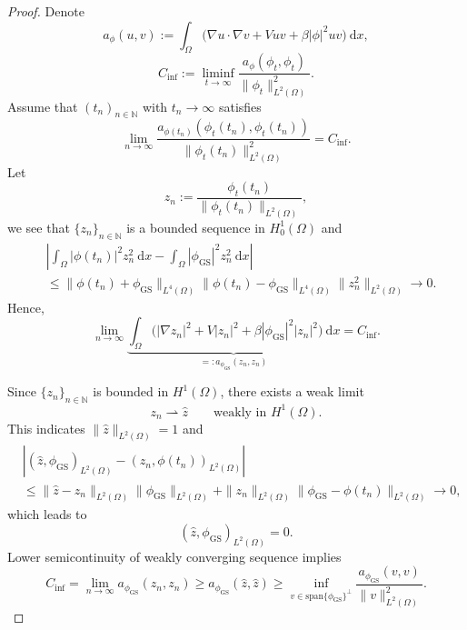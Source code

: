 \documentclass{siamart250211}
\begin{document}
\begin{proof}
Denote 
\begin{equation*}
a_{\phi}(u,v):= \int_{\Omega} \Big( \nabla u \cdot \nabla v + V uv + \beta|\phi|^2 uv \Big) \ \text{d}x,
\end{equation*}
\begin{equation*}
	C_{\text{inf}}:= \liminf_{t \to \infty} \frac{a_{\phi}(\phi_t,\phi_t)}{\|\phi_t\|_{L^2(\Omega)}^2}.
\end{equation*}
Assume that $(t_n)_{n \in \mathbb{N}}$ with $t_n \to \infty$ satisfies
\begin{equation*}
	\lim_{n \to \infty} \frac{a_{\phi(t_n)}(\phi_t(t_n),\phi_t(t_n))}{\|\phi_t(t_n)\|_{L^2(\Omega)}^2} = C_{\text{inf}}.
\end{equation*}
Let
\begin{equation*}
	z_n:= \frac{\phi_t(t_n)}{\|\phi_t(t_n)\|_{L^2(\Omega)}},
\end{equation*}
we see that $\{z_n\}_{n \in \mathbb{N}}$ is a bounded sequence in $H_0^1(\Omega)$ and
\begin{align*}
	&\left| \int_{\Omega} |\phi(t_n)|^2 z_n^2 \ \text{d}x - \int_{\Omega} |\phi_{\text{GS}}|^2 z_n^2 \ \text{d}x    \right| \\
	 & \le \| \phi(t_n) + \phi_{\text{GS}}\|_{L^4(\Omega)}\| \phi(t_n) - \phi_{\text{GS}}\|_{L^4(\Omega)}\|z_n^2\|_{L^2(\Omega)}  \to 0.
\end{align*}
Hence, 
\begin{equation*}
	\lim_{n \to \infty} \underbrace{ \int_{\Omega} \Big( |\nabla  z_n|^2 + V| z_n|^2 + \beta|\phi_{\text{GS}}|^2 |z_n|^2 \Big) \ \text{d}x}_{=: a_{\phi_{\text{GS}}}(z_n,z_n)} = C_{\text{inf}}.
\end{equation*}

Since $\{z_n\}_{n \in \mathbb{N}}$ is bounded in $H^1(\Omega)$, there exists a weak limit 
\begin{equation*}
	z_n \rightharpoonup \hat{z} \qquad \text{weakly in $H^1(\Omega)$}.
\end{equation*}
This indicates $\|\hat{z}\|_{L^2(\Omega)} = 1$ and
\begin{align*}
	&\left| (\hat{z}, \phi_{\text{GS}})_{L^2(\Omega)} - (z_n, \phi(t_n))_{L^2(\Omega)}  \right| \\
	 &\le \|\hat{z} - z_n\|_{L^2(\Omega)}\|\phi_{\text{GS}}\|_{L^2(\Omega)} + \|z_n\|_{L^2(\Omega)}\|\phi_{\text{GS}} - \phi(t_n)\|_{L^2(\Omega)}  \to 0,
\end{align*} 
which leads to
\begin{equation*}
	(\hat{z}, \phi_{\text{GS}})_{L^2(\Omega)} = 0.
\end{equation*}
Lower semicontinuity of weakly converging sequence implies 
\begin{equation*}
	C_{\text{inf}} = \lim_{n \to \infty}a_{\phi_{\text{GS}}}(z_n,z_n) \ge a_{\phi_{\text{GS}}}(\hat{z}, \hat{z}) \ge \inf_{v \in \text{span}\{\phi_{\text{GS}}\}^\bot} \frac{a_{\phi_{\text{GS}}}(v, v)}{\|v\|_{L^2(\Omega)}^2}.
\end{equation*}


\end{proof}
\end{document}
